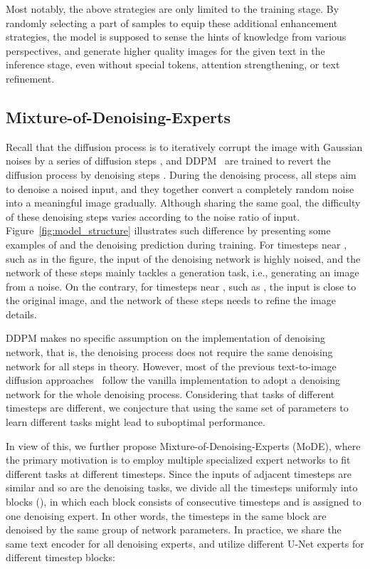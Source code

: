 \documentclass[10pt,twocolumn,letterpaper]{article}
\begin{document}
Most notably, the above strategies are only limited to the training stage. By randomly selecting a part of samples to equip these additional enhancement strategies, the model is supposed to sense the hints of knowledge from various perspectives, and generate higher quality images for the given text in the inference stage, even without special tokens, attention strengthening, or text refinement.


\subsection{Mixture-of-Denoising-Experts}

Recall that the diffusion process is to iteratively corrupt the image with Gaussian noises by a series of diffusion steps , and DDPM~\cite{DBLP:conf/nips/HoJA20} are trained to revert the diffusion process by denoising steps .
During the denoising process, all steps aim to denoise a noised input, and they together convert a completely random noise into a meaningful image gradually.
Although sharing the same goal, the difficulty of these denoising steps varies according to the noise ratio of input.
Figure~\ref{fig:model_structure} illustrates such difference by presenting some examples of  and the denoising prediction  during training. For timesteps  near , such as  in the figure, the input of the denoising network  is highly noised, and the network of these steps mainly tackles a generation task, i.e., generating an image from a noise.
On the contrary, for timesteps  near , such as , the input  is close to the original image, and the network of these steps needs to refine the image details.

DDPM makes no specific assumption on the implementation of denoising network, that is, the denoising process does not require the same denoising network for all steps in theory.
However, most of the previous text-to-image diffusion approaches~\cite{DBLP:journals/corr/abs-2112-10752,DBLP:conf/icml/NicholDRSMMSC22,DBLP:journals/corr/abs-2204-06125,DBLP:journals/corr/abs-2205-11487} follow the vanilla implementation to adopt a denoising network for the whole denoising process.
Considering that tasks of different timesteps are different, we conjecture that using the same set of parameters to learn different tasks might lead to suboptimal performance.

In view of this, we further propose Mixture-of-Denoising-Experts (MoDE), where the primary motivation is to employ multiple specialized expert networks to fit different tasks at different timesteps.
Since the inputs of adjacent timesteps are similar and so are the denoising tasks, we divide all the timesteps uniformly into  blocks (), in which each block consists of consecutive timesteps and is assigned to one denoising expert. In other words, the timesteps in the same block are denoised by the same group of network parameters.
In practice, we share the same text encoder for all denoising experts, and utilize different U-Net experts for different timestep blocks:
\end{document}
